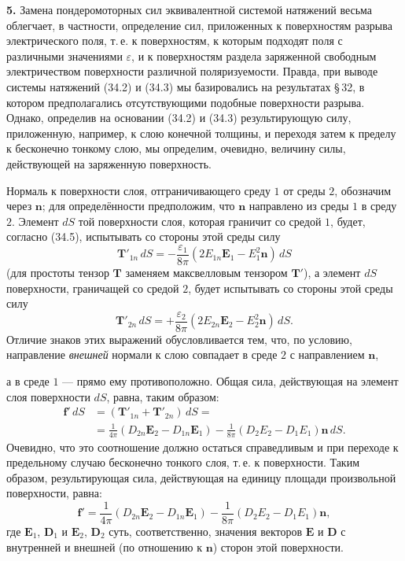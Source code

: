 \documentclass[a4paper,12pt]{article}
\begin{document}
\textbf{5.} Замена пондеромоторных сил эквивалентной системой натяжений
весьма облегчает, в частности, определение сил, приложенных к
поверхностям разрыва электрического поля, т.\,е. к поверхностям,
к которым подходят поля с различными значениями $\varepsilon$, и к
поверхностям раздела заряженной свободным электричеством поверхности
различной поляризуемости. Правда, при выводе системы натяжений (34.2)
и (34.3) мы базировались на результатах §\,32, в котором предполагались
отсутствующими подобные поверхности разрыва. Однако, определив на
основании (34.2) и (34.3) результирующую силу, приложенную, например,
к слою конечной толщины, и переходя затем к пределу к бесконечно
тонкому слою, мы определим, очевидно, величину силы, действующей на
заряженную поверхность.

Нормаль к поверхности слоя, отграничивающего среду $1$ от среды $2$,
обозначим через $\mathbf{n}$; для определённости предположим, что
$\mathbf{n}$ направлено из среды $1$ в среду $2$. Элемент $dS$ той
поверхности слоя, которая граничит со средой $1$, будет, согласно
(34.5), испытывать со стороны этой среды силу
$$
    \mathbf{T}'_{1n}\,dS = -\frac{\varepsilon_1}{8\pi}
    (2E_{1n}\mathbf{E}_1 - E_1^2\mathbf{n})\,dS
$$
(для простоты тензор $\mathbf{T}$ заменяем максвелловым тензором
$\mathbf{T}'$), а элемент $dS$ поверхности, граничащей со средой $2$,
будет испытывать со стороны этой среды силу
$$
    \mathbf{T}'_{2n}\,dS = +\frac{\varepsilon_2}{8\pi}
    (2E_{2n}\mathbf{E}_2 - E_2^2\mathbf{n})\,dS.
$$
Отличие знаков этих выражений обусловливается тем, что, по условию,
направление \textit{внешней} нормали к слою совпадает в среде $2$
с направлением $\mathbf{n}$,


а в среде $1$ — прямо ему противоположно. Общая сила, действующая
на элемент слоя поверхности $dS$, равна, таким образом:
\begin{align*}
    \mathbf{f}'\,dS &= (\mathbf{T}'_{1n} + \mathbf{T}'_{2n})\,dS = \\
    &= \frac{1}{4\pi}(D_{2n}\mathbf{E}_2 - D_{1n}\mathbf{E}_1)
     - \frac{1}{8\pi}(D_2 E_2 - D_1 E_1)\mathbf{n}\,dS.
\end{align*}
Очевидно, что это соотношение должно остаться справедливым и при
переходе к предельному случаю бесконечно тонкого слоя, т.\,е.
к поверхности. Таким образом, результирующая сила, действующая на
единицу площади произвольной поверхности, равна:
\begin{equation}
    \mathbf{f}' = \frac{1}{4\pi}(D_{2n}\mathbf{E}_2 - D_{1n}\mathbf{E}_1)
               - \frac{1}{8\pi}(D_2 E_2 - D_1 E_1)\mathbf{n},
    \tag{34.8}
\end{equation}
где $\mathbf{E}_1$, $\mathbf{D}_1$ и $\mathbf{E}_2$, $\mathbf{D}_2$ суть,
соответственно, значения векторов $\mathbf{E}$ и $\mathbf{D}$ с внутренней
и внешней (по отношению к $\mathbf{n}$) сторон этой поверхности.
\end{document}
